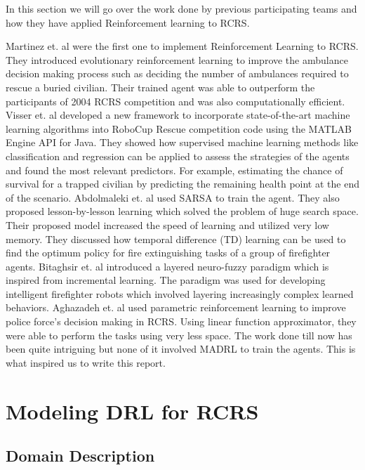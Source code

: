 \documentclass[12pt]{report}
\begin{document}
In this section we will go over the work done by previous participating teams and how they have applied Reinforcement learning to RCRS. 

Martinez et. al \cite{Martinez} were the first one to implement Reinforcement Learning to RCRS. They introduced evolutionary reinforcement learning to improve the ambulance decision making process such as deciding the number of ambulances required to rescue a buried civilian. Their trained agent was able to outperform the participants of 2004 RCRS competition and was also computationally efficient. Visser et. al \cite{Visser2018RoboCupRS} developed a new framework to incorporate state-of-the-art machine learning algorithms into RoboCup Rescue competition code using the MATLAB Engine API for Java. They showed how supervised machine learning methods like classification and regression can be applied to assess the strategies of the agents and found the most relevant predictors. For example, estimating the chance of survival for a trapped civilian by predicting the remaining health point at the end of the scenario. Abdolmaleki et. al \cite{abdolmaleki} used SARSA to train the agent. They also proposed lesson-by-lesson learning which solved the problem of huge search space. Their proposed model increased the speed of learning and utilized very low memory. They discussed how temporal difference (TD) learning can be used to find the optimum policy for fire extinguishing tasks of a group of firefighter agents. Bitaghsir et. al \cite{Bitaghsir} introduced a layered neuro-fuzzy paradigm which is inspired from incremental learning. The paradigm was used for developing intelligent firefighter robots which involved layering increasingly complex learned behaviors. Aghazadeh et. al \cite{Aghazadeh} used parametric reinforcement learning to improve police force's decision making in RCRS. Using linear function approximator, they were able to perform the tasks using very less space. The work done till now has been quite intriguing but none of it involved MADRL to train the agents. This is what inspired us to write this report. 

\chapter{Modeling DRL for RCRS}

\section{Domain Description}
\end{document}
